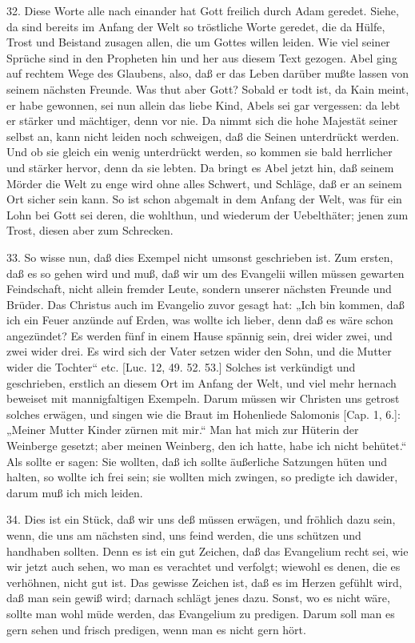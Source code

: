 32. Diese Worte alle nach einander hat Gott freilich durch Adam geredet. Siehe, da sind bereits im Anfang der Welt so tröstliche Worte geredet, die da Hülfe, Trost und Beistand zusagen allen, die um Gottes willen leiden. Wie viel seiner Sprüche sind in den Propheten hin und her aus diesem Text gezogen. Abel ging auf rechtem Wege des Glaubens, also, daß er das Leben darüber mußte lassen von seinem nächsten Freunde. Was thut aber Gott? Sobald er todt ist, da Kain meint, er habe gewonnen, sei nun allein das liebe Kind, Abels sei gar vergessen: da lebt er stärker und mächtiger, denn vor nie. Da nimmt sich die hohe Majestät seiner selbst an, kann nicht leiden noch schweigen, daß die Seinen unterdrückt werden. Und ob sie gleich ein wenig unterdrückt werden, so kommen sie bald herrlicher und stärker hervor, denn da sie lebten. Da bringt es Abel jetzt hin, daß seinem Mörder die Welt zu enge wird ohne alles Schwert, und Schläge, daß er an seinem Ort sicher sein kann. So ist schon abgemalt in dem Anfang der Welt, was für ein Lohn bei Gott sei deren, die wohlthun, und wiederum der Uebelthäter; jenen zum Trost, diesen aber zum Schrecken.

33. So wisse nun, daß dies Exempel nicht umsonst geschrieben ist. Zum ersten, daß es so gehen wird und muß, daß wir um des Evangelii willen müssen gewarten Feindschaft, nicht allein fremder Leute, sondern unserer nächsten Freunde und Brüder. Das Christus auch im Evangelio zuvor gesagt hat: „Ich bin kommen, daß ich ein Feuer anzünde auf Erden, was wollte ich lieber, denn daß es wäre schon angezündet? Es werden fünf in einem Hause spännig sein, drei wider zwei, und zwei wider drei. Es wird sich der Vater setzen wider den Sohn, und die Mutter wider die Tochter“ etc. [Luc. 12, 49. 52. 53.] Solches ist verkündigt und geschrieben, erstlich an diesem Ort im Anfang der Welt, und viel mehr hernach beweiset mit mannigfaltigen Exempeln. Darum müssen wir Christen uns getrost solches erwägen, und singen wie die Braut im Hohenliede Salomonis [Cap. 1, 6.]: „Meiner Mutter Kinder zürnen mit mir.“ Man hat mich zur
Hüterin der Weinberge gesetzt; aber meinen Weinberg, den ich hatte, habe ich nicht behütet.“ Als sollte er sagen: Sie wollten, daß ich sollte äußerliche Satzungen hüten und halten, so wollte ich frei sein; sie wollten mich zwingen, so predigte ich dawider, darum muß ich mich leiden.

34. Dies ist ein Stück, daß wir uns deß müssen erwägen, und fröhlich dazu sein, wenn, die uns am nächsten sind, uns feind werden, die uns schützen und handhaben sollten. Denn es ist ein gut Zeichen, daß das Evangelium recht sei, wie wir jetzt auch sehen, wo man es verachtet und verfolgt; wiewohl es denen, die es verhöhnen, nicht gut ist. Das gewisse Zeichen ist, daß es im Herzen gefühlt wird, daß man sein gewiß wird; darnach schlägt jenes dazu. Sonst, wo es nicht wäre, sollte man wohl müde werden, das Evangelium zu predigen. Darum soll man es gern sehen und frisch predigen, wenn man es nicht gern hört.

